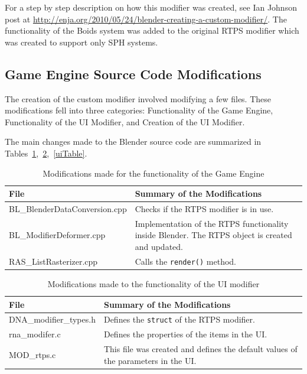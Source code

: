 For a step by step description on how this modifier was created, see Ian Johnson post at \url{http://enja.org/2010/05/24/blender-creating-a-custom-modifier/}.  The functionality of the Boids system was added to the original RTPS modifier which was created to support only SPH systems. 

\subsection{Game Engine Source Code Modifications}
The creation of the custom modifier involved modifying a few files. These modifications fell into three categories: Functionality of the Game Engine, Functionality of the UI Modifier, and  Creation of the UI Modifier.

The main changes made to the Blender source code are summarized in Tables~\ref{geTable},~\ref{funcTable},~\ref{uiTable}.


\begin{table}[htdp]
\caption{Modifications made for the functionality of the Game Engine}
\begin{center}
\begin{tabular}{|p{6cm}|p{6cm}|}
\hline 
\textbf{File} & \textbf{Summary of the Modifications} \\\hline 
BL\_BlenderDataConversion.cpp & Checks if the RTPS modifier is in use. \\\hline 
BL\_ModifierDeformer.cpp & Implementation of the RTPS functionality inside Blender. The RTPS object is created and updated. \\\hline 
RAS\_ListRasterizer.cpp & Calls the \texttt{render()} method. \\
\hline 
\end{tabular} 
\end{center}
\label{geTable}
\end{table}

\begin{table}[htdp]
\caption{Modifications made to the functionality of the UI modifier}
\begin{center}
\begin{tabular}{|p{6cm}|p{6cm}|}
\hline 
\textbf{File} & \textbf{Summary of the Modifications} \\\hline 
DNA\_modifier\_types.h & Defines the \texttt{struct} of the RTPS modifier. \\\hline 
rna\_modifer.c & Defines the properties of the items in the UI. \\\hline 
MOD\_rtps.c & This file was created and defines the default values of the parameters in the UI. \\
\hline 
\end{tabular}
\end{center}
\label{funcTable}
\end{table}


